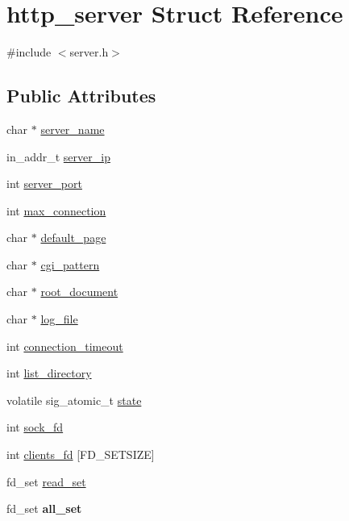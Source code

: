 \hypertarget{structhttp__server}{
\section{http\_\-server Struct Reference}
\label{structhttp__server}
}


{\ttfamily \#include $<$server.h$>$}

\subsection*{Public Attributes}
\begin{DoxyCompactItemize}
\item 
char $\ast$ \hyperlink{structhttp__server_afdeb11488dbc8aa350c3f7506ec65eba}{server\_\-name}
\item 
in\_\-addr\_\-t \hyperlink{structhttp__server_ad3110d5628168b14bcdcc7a7fed3f021}{server\_\-ip}
\item 
int \hyperlink{structhttp__server_a8f2e0f8f3c7919c65797bd2839723f45}{server\_\-port}
\item 
int \hyperlink{structhttp__server_a604db1118f08a81a5c7af5292ceafbae}{max\_\-connection}
\item 
char $\ast$ \hyperlink{structhttp__server_ab91aa6ac27175544a71f89764137ace9}{default\_\-page}
\item 
char $\ast$ \hyperlink{structhttp__server_ad1ae54cf82b2a45d41e0fd940cd55bd0}{cgi\_\-pattern}
\item 
char $\ast$ \hyperlink{structhttp__server_a25d2bb352f5d3fdd09ce7fbe266f6aac}{root\_\-document}
\item 
char $\ast$ \hyperlink{structhttp__server_aa0f74d26cdfb2eb7bd3160e29d3a1cd3}{log\_\-file}
\item 
int \hyperlink{structhttp__server_a2adef7772851f50f0058fa9cfc8f240d}{connection\_\-timeout}
\item 
int \hyperlink{structhttp__server_a6861735a5369b0f870027098e6a45add}{list\_\-directory}
\item 
volatile sig\_\-atomic\_\-t \hyperlink{structhttp__server_a8f13ce40020f68f463f426722c69f85d}{state}
\item 
int \hyperlink{structhttp__server_a206c0a97950f18794d7af217796eeb8d}{sock\_\-fd}
\item 
int \hyperlink{structhttp__server_ab5ad96c5f1ef00fc3ee2fbf9c344e536}{clients\_\-fd} \mbox{[}FD\_\-SETSIZE\mbox{]}
\item 
fd\_\-set \hyperlink{structhttp__server_a0ef8e756d2761544802490883444ea7e}{read\_\-set}
\item 
\hypertarget{structhttp__server_abbeaf899bb1eef2805d8859d6bb04d1d}{
fd\_\-set {\bfseries all\_\-set}}
\label{structhttp__server_abbeaf899bb1eef2805d8859d6bb04d1d}

\end{DoxyCompactItemize}


